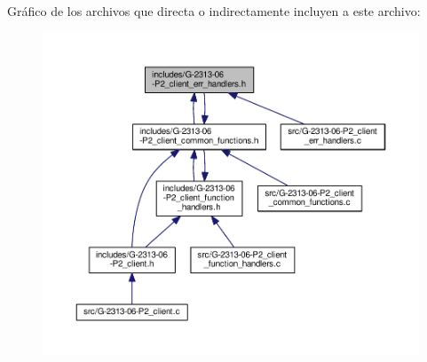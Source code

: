 Gráfico de los archivos que directa o indirectamente incluyen a este archivo\+:\nopagebreak
\begin{figure}[H]
\begin{center}
\leavevmode
\includegraphics[width=350pt]{G-2313-06-P2__client__err__handlers_8h__dep__incl}
\end{center}
\end{figure}
